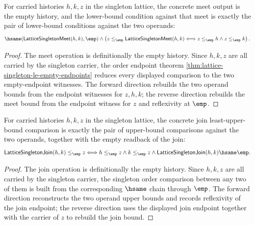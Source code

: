 \begin{theorem}
\label{thm:lattice-singleton-meet-greatest-lower-bound}
For carried histories $h,k,z$ in the singleton lattice, the concrete meet output
is the empty history, and the lower-bound condition against that meet is exactly
the pair of lower-bound conditions against the two operands:
$$
\hsame(\mathsf{LatticeSingletonMeet}(h,k),\emp)
\land
\left(
z\le_{\emp}\mathsf{LatticeSingletonMeet}(h,k)
\Longleftrightarrow
z\le_{\emp} h\land z\le_{\emp} k
\right).
$$
\end{theorem}
\begin{proof}
The meet operation is definitionally the empty history. Since $h,k,z$ are all
carried by the singleton carrier, the order endpoint theorem
\autoref{thm:lattice-singleton-le-empty-endpoints} reduces every displayed
comparison to the two empty-endpoint witnesses. The forward direction rebuilds
the two operand bounds from the endpoint witnesses for $z,h,k$; the reverse
direction rebuilds the meet bound from the endpoint witness for $z$ and
reflexivity at $\emp$.
\end{proof}

\begin{theorem}
\label{thm:lattice-singleton-join-least-upper-bound-empty-iff}
For carried histories $h,k,z$ in the singleton lattice, the concrete join
least-upper-bound comparison is exactly the pair of upper-bound comparisons
against the two operands, together with the empty readback of the join:
$$
\mathsf{LatticeSingletonJoin}(h,k)\le_{\emp} z
\Longleftrightarrow
h\le_{\emp} z\land k\le_{\emp} z\land
\mathsf{LatticeSingletonJoin}(h,k)\hsame\emp.
$$
\end{theorem}
\begin{proof}
The join operation is definitionally the empty history. Since $h,k,z$ are all
carried by the singleton carrier, the singleton order comparison between any
two of them is built from the corresponding \(\hsame\) chain through \(\emp\).
The forward direction reconstructs the two operand upper bounds and records
reflexivity of the join endpoint; the reverse direction uses the displayed join
endpoint together with the carrier of \(z\) to rebuild the join bound.
\end{proof}

